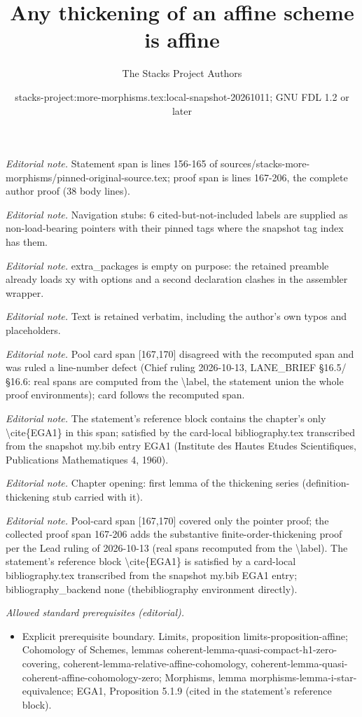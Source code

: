 \documentclass[10pt,a4paper]{amsart}
\title{Any thickening of an affine scheme is affine}
\author{The Stacks Project Authors}
\date{stacks-project:more-morphisms.tex:local-snapshot-20261011; GNU FDL 1.2 or later}
\theoremstyle{plain}
\theoremstyle{definition}
\theoremstyle{remark}
\numberwithin{equation}{subsection}
\begin{document}
\maketitle
\noindent\textit{Editorial note.} Statement span is lines 156-165 of sources/stacks-more-morphisms/pinned-original-source.tex; proof span is lines 167-206, the complete author proof (38 body lines).\par\medskip
\noindent\textit{Editorial note.} Navigation stubs: 6 cited-but-not-included labels are supplied as non-load-bearing pointers with their pinned tags where the snapshot tag index has them.\par\medskip
\noindent\textit{Editorial note.} extra\_packages is empty on purpose: the retained preamble already loads xy with options and a second declaration clashes in the assembler wrapper.\par\medskip
\noindent\textit{Editorial note.} Text is retained verbatim, including the author's own typos and placeholders.\par\medskip
\noindent\textit{Editorial note.} Pool card span [167,170] disagreed with the recomputed span and was ruled a line-number defect (Chief ruling 2026-10-13, LANE\_BRIEF §16.5/§16.6: real spans are computed from the \textbackslash{}label, the statement union the whole proof environments); card follows the recomputed span.\par\medskip
\noindent\textit{Editorial note.} The statement's reference block contains the chapter's only \textbackslash{}cite\{EGA1\} in this span; satisfied by the card-local bibliography.tex transcribed from the snapshot my.bib entry EGA1 (Institute des Hautes Etudes Scientifiques, Publications Mathematiques 4, 1960).\par\medskip
\noindent\textit{Editorial note.} Chapter opening: first lemma of the thickening series (definition-thickening stub carried with it).\par\medskip
\noindent\textit{Editorial note.} Pool-card span [167,170] covered only the pointer proof; the collected proof span 167-206 adds the substantive finite-order-thickening proof per the Lead ruling of 2026-10-13 (real spans recomputed from the \textbackslash{}label). The statement's reference block \textbackslash{}cite\{EGA1\} is satisfied by a card-local bibliography.tex transcribed from the snapshot my.bib EGA1 entry; bibliography\_backend none (thebibliography environment directly).\par\medskip
\noindent\textit{Allowed standard prerequisites (editorial).}\begin{itemize}
\item Explicit prerequisite boundary. Limits, proposition limits-proposition-affine; Cohomology of Schemes, lemmas coherent-lemma-quasi-compact-h1-zero-covering, coherent-lemma-relative-affine-cohomology, coherent-lemma-quasi-coherent-affine-cohomology-zero; Morphisms, lemma morphisms-lemma-i-star-equivalence; EGA1, Proposition 5.1.9 (cited in the statement's reference block).
\end{itemize}\medskip
\end{document}
